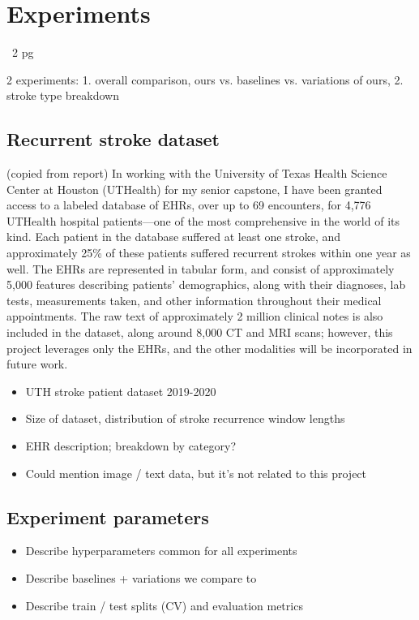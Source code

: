 \documentclass[conference]{IEEEtran}
\begin{document}
\section{Experiments}
~2 pg

2 experiments: 1. overall comparison, ours vs. baselines vs. variations of ours, 2. stroke type breakdown

\subsection{Recurrent stroke dataset}

{\color{red} (copied from report)} In working with the University of Texas Health Science Center at Houston (UTHealth) for my senior capstone, 
I have been granted access to a labeled database of EHRs, over up to 69 encounters, for 4,776 UTHealth hospital patients---one of the most comprehensive in the world of its kind. 
Each patient in the database suffered at least one stroke, and approximately 25\% of these patients suffered recurrent strokes within one year as well. 
The EHRs are represented in tabular form, and consist of approximately 5,000 features describing patients' demographics, along with their diagnoses, lab tests, measurements taken, and other information throughout their medical appointments. 
The raw text of approximately 2 million clinical notes is also included in the dataset, along around 8,000 CT and MRI scans; however, this project leverages only the EHRs, and the other modalities will be incorporated in future work.

\begin{itemize}
    \item UTH stroke patient dataset 2019-2020
    \item Size of dataset, distribution of stroke recurrence window lengths
    \item EHR description; breakdown by category?
    \item Could mention image / text data, but it's not related to this project
\end{itemize}

\subsection{Experiment parameters}
\begin{itemize}
    \item Describe hyperparameters common for all experiments
    \item Describe baselines + variations we compare to
    \item Describe train / test splits (CV) and evaluation metrics
\end{itemize}
\end{document}
